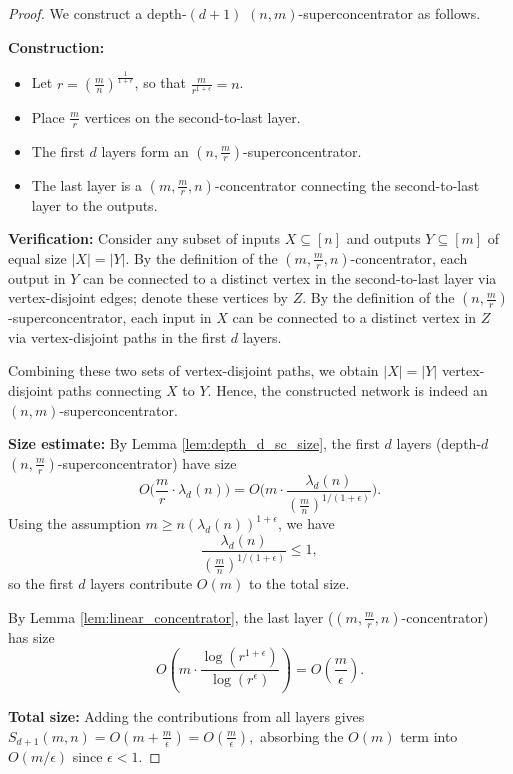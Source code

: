 \documentclass[11pt]{article}
\begin{document}
\begin{proof}
We construct a depth-$(d+1)$ $(n,m)$-superconcentrator as follows.  

\medskip
\noindent\textbf{Construction:}  
\begin{itemize}
    \item Let $r = \left( \frac{m}{n} \right)^{\frac{1}{1+\epsilon}}$, so that $\frac{m}{r^{1+\epsilon}} = n$.  
    \item Place $\frac{m}{r}$ vertices on the second-to-last layer.  
    \item The first $d$ layers form an $(n, \frac{m}{r})$-superconcentrator. 
    \item The last layer is a $(m, \frac{m}{r}, n)$-concentrator connecting the second-to-last layer to the outputs.  
\end{itemize}

\medskip
\noindent\textbf{Verification:}  
Consider any subset of inputs $X \subseteq [n]$ and outputs $Y \subseteq [m]$ of equal size $|X| = |Y|$.  
By the definition of the $(m, \frac{m}{r}, n)$-concentrator, each output in $Y$ can be connected to a distinct vertex in the second-to-last layer via vertex-disjoint edges; denote these vertices by $Z$.  
By the definition of the $(n, \frac{m}{r})$-superconcentrator, each input in $X$ can be connected to a distinct vertex in $Z$ via vertex-disjoint paths in the first $d$ layers.  

Combining these two sets of vertex-disjoint paths, we obtain $|X| = |Y|$ vertex-disjoint paths connecting $X$ to $Y$.  
Hence, the constructed network is indeed an $(n,m)$-superconcentrator.

\medskip
\noindent\textbf{Size estimate:}  
By Lemma \ref{lem:depth_d_sc_size}, the first $d$ layers (depth-$d$ $(n, \frac{m}{r})$-superconcentrator) have size
\[
O\Big(\frac{m}{r} \cdot \lambda_d(n)\Big) = O\Big( m \cdot \frac{\lambda_d(n)}{(\frac{m}{n})^{1/(1+\epsilon)}} \Big).
\]
Using the assumption $m \ge n (\lambda_d(n))^{1+\epsilon}$, we have
\[
\frac{\lambda_d(n)}{(\frac{m}{n})^{1/(1+\epsilon)}} \le 1,
\]
so the first $d$ layers contribute $O(m)$ to the total size.

By Lemma \ref{lem:linear_concentrator}, the last layer ($(m, \frac{m}{r}, n)$-concentrator) has size
\[
O\left( m \cdot \frac{\log(r^{1+\epsilon})}{\log(r^\epsilon)} \right) = O\left( \frac{m}{\epsilon} \right).
\]

\medskip
\noindent\textbf{Total size:}  
Adding the contributions from all layers gives
$
S_{d+1}(m,n) = O\left( m + \frac{m}{\epsilon} \right) = O\left( \frac{m}{\epsilon} \right),
$
absorbing the $O(m)$ term into $O(m/\epsilon)$ since $\epsilon < 1$.  
\end{proof}
\end{document}
